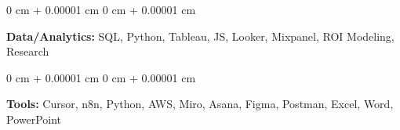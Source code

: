 \documentclass[10pt, letterpaper]{article}
\newenvironment{onecolentry}{
    \begin{adjustwidth}{
        0 cm + 0.00001 cm
    }{
        0 cm + 0.00001 cm
    }
}{
    \end{adjustwidth}
} %
\begin{document}
        \vspace{0.1 cm}

        \begin{onecolentry}
            \textbf{Data/Analytics:} SQL, Python, Tableau, JS, Looker, Mixpanel, ROI Modeling, Research
        \end{onecolentry}

        \vspace{0.1 cm}

        \begin{onecolentry}
            \textbf{Tools:} Cursor, n8n, Python, AWS, Miro, Asana, Figma, Postman, Excel, Word, PowerPoint
        \end{onecolentry}

    
\end{document}
